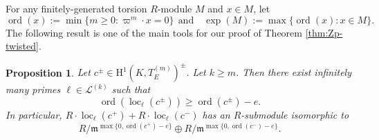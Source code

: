 \documentclass[a4paper,10pt]{amsart}
\numberwithin{equation}{section}
\numberwithin{equation}{section}
\theoremstyle{plain}
\theoremstyle{definition}
\theoremstyle{definition}
\theoremstyle{plain}
\newtheorem{prop}[thm]{Proposition}
\theoremstyle{plain}
\theoremstyle{plain}
\theoremstyle{plain}
\DeclareMathOperator{\ord}{ord}
\DeclareMathOperator{\loc}{loc}
\newcommand{\cL}{\mathscr{L}}
\newcommand{\fm}{\mathfrak{m}}
\newcommand{\rH}{\mathrm{H}}
\begin{document}
For any finitely-generated torsion $R$-module $M$ and $x\in M$, let
$$
\ord(x):=\min\{m\geqslant 0: \varpi^m\cdot x =0\} \ \ \text{and } \ \ \ \exp(M):=\max\{\ord(x):x\in M\}.
$$
The following result %
is one of the main tools for our proof of Theorem \ref{thm:Zp-twisted}. 
\begin{prop}\label{prop:prime2} 
Let $c^\pm \in \rH^1(K,T_E^{(m)})^\pm$.  Let $k\geq m$. 
Then there exist infinitely many primes $\ell\in \cL^{(k)}$ such that 
$$
\ord(\loc_\ell(c^\pm)) \geqslant \ord(c^\pm) - e.
$$
In particular, $R\cdot \loc_\ell(c^+)+ R\cdot \loc_\ell(c^-)$ has an $R$-submodule isomorphic to  
$$
R/\fm^{\max\{0,\ord(c^+)-e\}}\oplus  R/\fm^{\max\{0,\ord(c^-)-e\}}.
$$
\end{prop}

\end{document}
